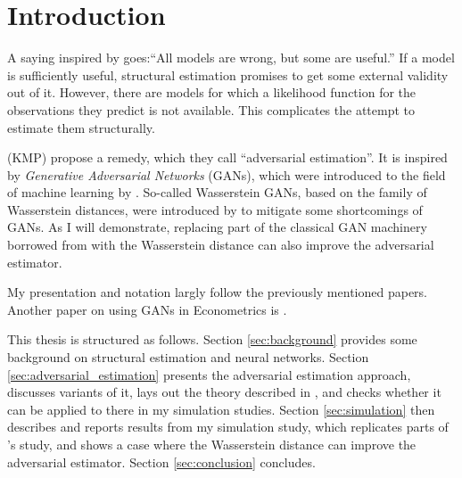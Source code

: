 \section{Introduction}
\label{sec:introduction}

A saying inspired by \textcite{Box1976} goes:``All models are wrong, but some are useful.''
If a model is sufficiently useful, structural estimation promises to get some external validity out of it.
However, there are models for which a likelihood function for the observations they predict is not available.
This complicates the attempt to estimate them structurally.

\textcite{kaji2023adversarial} (KMP) propose a remedy, which they call ``adversarial estimation''.
It is inspired by \textit{Generative Adversarial Networks} (GANs), which were introduced to the field of machine learning by \textcite{goodfellow2014generative}.
So-called Wasserstein GANs, based on the family of Wasserstein distances, were introduced by \textcite{arjovsky2017wassersteingan} to mitigate some shortcomings of GANs.
As I will demonstrate, replacing part of the classical GAN machinery borrowed from \textcite{goodfellow2014generative} with the Wasserstein distance can also improve the adversarial estimator.

My presentation and notation largly follow the previously mentioned papers.
Another paper on using GANs in Econometrics is \textcite{athey2021using}.

This thesis is structured as follows.
Section \ref{sec:background} provides some background on structural estimation and neural networks.
Section \ref{sec:adversarial_estimation} presents the adversarial estimation approach, discusses variants of it, lays out the theory described in \textcite{kaji2023adversarial}, and checks whether it can be applied to there in my simulation studies.
Section \ref{sec:simulation} then describes and reports results from my simulation study, which replicates parts of \textcite{kaji2023adversarial}'s study, and shows a case where the Wasserstein distance can improve the adversarial estimator.
Section \ref{sec:conclusion} concludes.